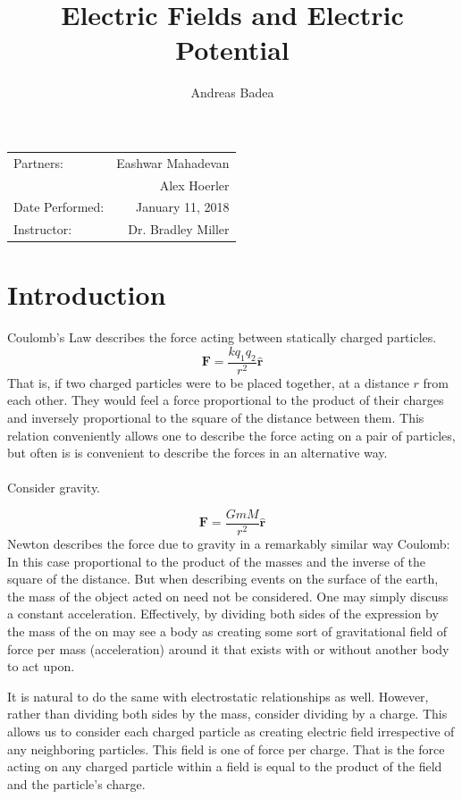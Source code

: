 \documentclass[11pt]{article}
\title{Electric Fields and Electric Potential}
\author{Andreas Badea}
\begin{document}
\maketitle
\begin{center}
	\begin{tabular}{l r}
		Partners: & Eashwar Mahadevan \\
		& Alex Hoerler \\
		Date Performed: & January 11, 2018 \\ %
		Instructor: & Dr. Bradley Miller %
	\end{tabular}
\end{center}

\section{Introduction}
Coulomb's Law describes the force acting between statically charged particles.
\begin{equation}
\mathbf{F} = \frac{k q_1 q_2}{r^2} \hat{\mathbf{r}}
\end{equation}
That is, if two charged particles were to be placed together, at a distance \(r\) from each other. They would feel a force proportional to the product of their charges and inversely proportional to the square of the distance between them. This relation conveniently allows one to describe the force acting on a pair of particles, but often is is convenient to describe the forces in an alternative way. 
\\\\
Consider gravity.

\begin{equation}
\mathbf{F} = \frac{G m M}{r^2} \hat{\mathbf{r}}
\end{equation}
 Newton describes the force due to gravity in a remarkably similar way Coulomb: In this case proportional to the product of the masses and the inverse of the square of the distance. But when describing events on the surface of the earth, the mass of the object acted on need not be considered. One may simply discuss a constant acceleration. Effectively, by dividing both sides of the expression by the mass of the on may see a body as creating some sort of gravitational field of force per mass (acceleration) around it that exists with or without another body to act upon.
 
It is natural to do the same with electrostatic relationships as well. However, rather than dividing both sides by the mass, consider dividing by a charge. This allows us to consider each charged particle as creating electric field irrespective of any neighboring particles. This field is one of force per charge. That is the force acting on any charged particle within a field is equal to the product of the field and the particle's charge.
\end{document}
